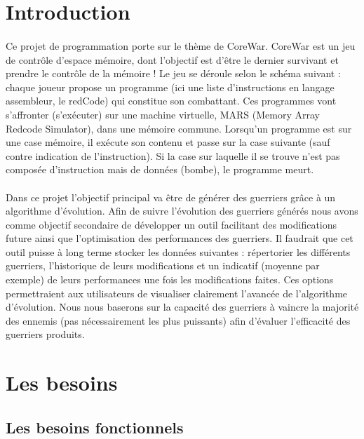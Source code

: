 \documentclass{article}
\begin{document}
    

\section{Introduction}
    \paragraph{} Ce projet de programmation porte sur le thème de CoreWar. CoreWar est un jeu de contrôle d'espace mémoire, dont l'objectif est d'être le dernier survivant et prendre le  contrôle de la mémoire ! Le jeu se déroule selon le schéma  suivant : chaque joueur propose un programme (ici une liste d'instructions en langage assembleur, le redCode) qui constitue son combattant. Ces programmes vont s'affronter (s'exécuter) sur une machine virtuelle, MARS (Memory Array Redcode Simulator), dans une mémoire commune. Lorsqu'un programme est sur une case mémoire, il exécute son contenu et passe sur la case suivante (sauf contre indication de l'instruction). Si la case sur laquelle il se trouve n'est pas composée d'instruction mais de données (bombe), le programme meurt. 

    \paragraph{} Dans ce projet l'objectif principal va être de générer des guerriers grâce à un algorithme d'évolution. Afin de suivre l'évolution des guerriers générés nous avons comme objectif secondaire de développer un outil facilitant des modifications future ainsi que l'optimisation des performances des guerriers. Il faudrait que cet outil puisse à long terme stocker les données suivantes : répertorier les différents guerriers, l'historique de leurs modifications et un indicatif (moyenne par exemple) de leurs performances une fois les modifications faites. Ces options permettraient aux utilisateurs de visualiser clairement l'avancée de l'algorithme d'évolution. Nous nous baserons sur la capacité des guerriers à vaincre la majorité des ennemis (pas nécessairement les plus puissants) afin d'évaluer l'efficacité des guerriers produits. 


\section{Les besoins}
    \subsection{Les besoins fonctionnels}
\end{document}
